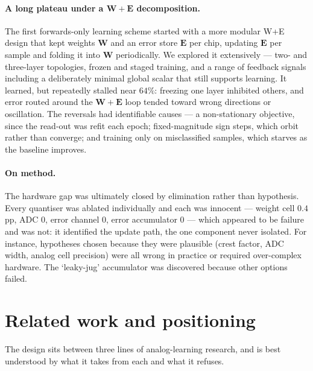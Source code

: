 \documentclass[11pt]{article}
\begin{document}
\hypertarget{a-long-plateau-under-a-bm-wbm-e-decomposition.}{%
\paragraph{\texorpdfstring{A long plateau under a \(\bm W{+}\bm E\)
decomposition.}{A long plateau under a \textbackslash bm W\{+\}\textbackslash bm E decomposition.}}\label{a-long-plateau-under-a-bm-wbm-e-decomposition.}}

The first forwards-only learning scheme started with a more modular W+E
design that kept weights \(\bm W\) and an error store \(\bm E\) per
chip, updating \(\bm E\) per sample and folding it into \(\bm W\)
periodically. We explored it extensively --- two- and three-layer
topologies, frozen and staged training, and a range of feedback signals
including a deliberately minimal global scalar that still supports
learning. It learned, but repeatedly stalled near \(64\%\): freezing one
layer inhibited others, and error routed around the \(\bm W{+}\bm E\)
loop tended toward wrong directions or oscillation. The reversals had
identifiable causes --- a non-stationary objective, since the read-out
was refit each epoch; fixed-magnitude sign steps, which orbit rather
than converge; and training only on misclassified samples, which starves
as the baseline improves.

\hypertarget{on-method.}{%
\paragraph{On method.}\label{on-method.}}

The hardware gap was ultimately closed by elimination rather than
hypothesis. Every quantiser was ablated individually and each was
innocent --- weight cell \(0.4\) pp, ADC \(0\), error channel \(0\),
error accumulator \(0\) --- which appeared to be failure and was not: it
identified the update path, the one component never isolated. For
instance, hypotheses chosen because they were plausible (crest factor,
ADC width, analog cell precision) were all wrong in practice or required
over-complex hardware. The `leaky-jug' accumulator was discovered
because other options failed.

\hypertarget{sec:related}{%
\section{Related work and positioning}\label{sec:related}}

The design sits between three lines of analog-learning research, and is
best understood by what it takes from each and what it refuses.
\end{document}

